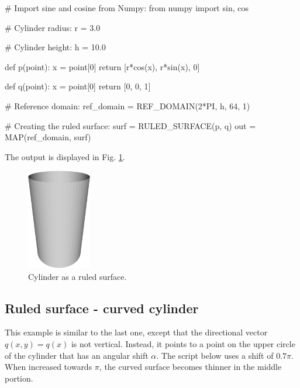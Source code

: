 \begin{bluecode}
# Import sine and cosine from Numpy:
from numpy import sin, cos

# Cylinder radius:
r = 3.0

# Cylinder height:
h = 10.0

def p(point):
    x = point[0]
    return [r*cos(x), r*sin(x), 0]
  
def q(point):
    x = point[0]
    return [0, 0, 1]

# Reference domain:  
ref_domain = REF_DOMAIN(2*PI, h, 64, 1)

# Creating the ruled surface:
surf = RULED_SURFACE(p, q)
out = MAP(ref_domain, surf)
\end{bluecode}
The output is displayed in Fig. \ref{fig:curves-8}.\\

\begin{figure}[!ht]
\begin{center}
\includegraphics[width=0.25\textwidth]{img/curves-8.png}
\end{center}
\vspace{-4mm}
\caption{Cylinder as a ruled surface.}
\label{fig:curves-8}
\end{figure}

\subsection{Ruled surface - curved cylinder}

This example is similar to the last one, except that the directional
vector $q(x, y) = q(x)$ is not vertical. Instead, it points 
to a point on the upper circle of the cylinder that has an 
angular shift $\alpha$. The script below uses a shift of $0.7\pi$. 
When increased towards $\pi$, the curved surface becomes thinner 
in the middle portion. 

